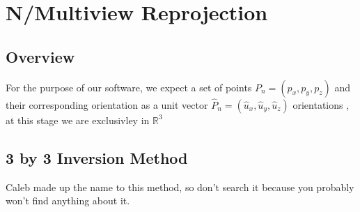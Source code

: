 \chapter{N/Multiview Reprojection}

\section{Overview}

For the purpose of our software, we expect a set of points $P_n = (p_x, p_y, p_z)$
and their corresponding orientation as a unit vector $\hat{P}_n = (\hat{u}_x, \hat{u}_y, \hat{u}_z)$
orientations , at this stage we are exclusivley in $\mathbb{R}^{3}$

\section{3 by 3 Inversion Method}
Caleb made up the name to this method, so don't search it because you probably
won't find anything about it. \\
\\
